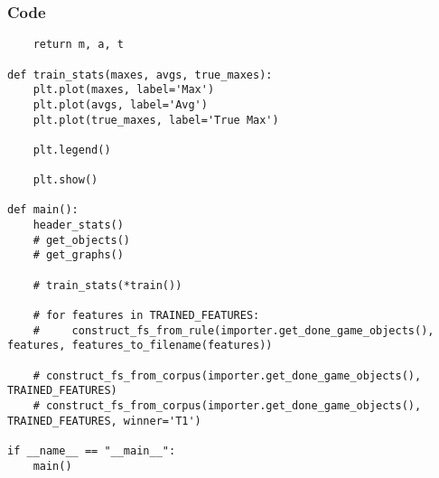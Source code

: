\documentclass{beamer}
\begin{document}
\begin{frame}[t, fragile]
    \frametitle{Code}
    \fontsize{3pt}{5pt}\selectfont
    \begin{verbatim}
    return m, a, t

def train_stats(maxes, avgs, true_maxes):
    plt.plot(maxes, label='Max')
    plt.plot(avgs, label='Avg')
    plt.plot(true_maxes, label='True Max')

    plt.legend()

    plt.show()

def main():
    header_stats()
    # get_objects()
    # get_graphs()

    # train_stats(*train())
    
    # for features in TRAINED_FEATURES:
    #     construct_fs_from_rule(importer.get_done_game_objects(), features, features_to_filename(features))

    # construct_fs_from_corpus(importer.get_done_game_objects(), TRAINED_FEATURES)
    # construct_fs_from_corpus(importer.get_done_game_objects(), TRAINED_FEATURES, winner='T1')

if __name__ == "__main__":
    main()
    \end{verbatim}
\end{frame}
\end{document}
